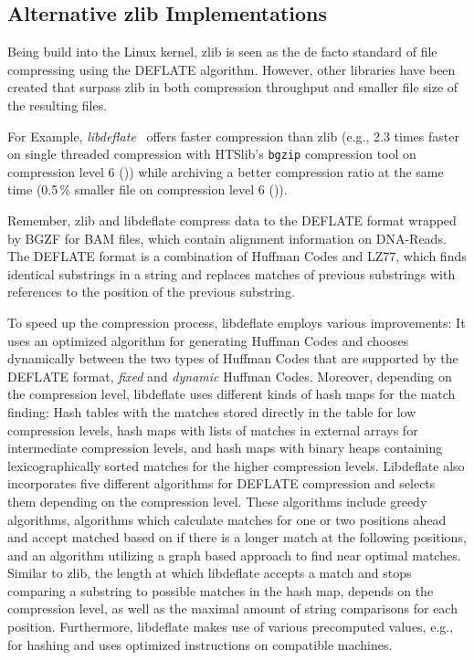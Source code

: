 \subsection{Alternative zlib Implementations}\label{altZlibs}
Being build into the Linux kernel, zlib is seen as the de facto standard of file compressing using the DEFLATE algorithm. However, other libraries have been created that surpass zlib in both compression throughput and smaller file size of the resulting files.

For Example, \textit{libdeflate}~\cite{biggers_ebiggerslibdeflate_2024} offers faster compression than zlib (e.g., 2.3 times faster on single threaded compression with HTSlib's \texttt{bgzip} compression tool on compression level 6 ()) while archiving a better compression ratio at the same time (0.5\,\% smaller file on compression level 6 ()).

Remember, zlib and libdeflate compress data to the DEFLATE format wrapped by BGZF for BAM files, which contain alignment information on DNA-Reads. The DEFLATE format is a combination of Huffman Codes and LZ77, which finds identical substrings in a string and replaces matches of previous substrings with references to the position of the previous substring.

To speed up the compression process, libdeflate employs various improvements: It uses an optimized algorithm for generating Huffman Codes and chooses dynamically between the two types of Huffman Codes that are supported by the DEFLATE format, \textit{fixed} and \textit{dynamic} Huffman Codes. Moreover, depending on the compression level, libdeflate uses different kinds of hash maps for the match finding: Hash tables with the matches stored directly in the table for low compression levels, hash maps with lists of matches in external arrays for intermediate compression levels, and hash maps with binary heaps containing lexicographically sorted matches for the higher compression levels. Libdeflate also incorporates five different algorithms for DEFLATE compression and selects them depending on the compression level. These algorithms include greedy algorithms, algorithms which calculate matches for one or two positions ahead and accept matched based on if there is a longer match at the following positions, and an algorithm utilizing a graph based approach to find near optimal matches. Similar to zlib, the length at which libdeflate accepts a match and stops comparing a substring to possible matches in the hash map, depends on the compression level, as well as the maximal amount of string comparisons for each position. Furthermore, libdeflate makes use of various precomputed values, e.g., for hashing and uses optimized instructions on compatible machines.

